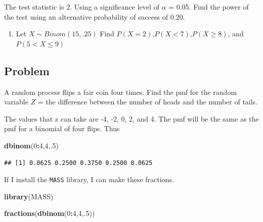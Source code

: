 \documentclass[]{book}
\newenvironment{Shaded}{\begin{snugshade}}{\end{snugshade}}
\newcommand{\KeywordTok}[1]{\textcolor[rgb]{0.13,0.29,0.53}{\textbf{#1}}}
\newcommand{\DecValTok}[1]{\textcolor[rgb]{0.00,0.00,0.81}{#1}}
\newcommand{\OperatorTok}[1]{\textcolor[rgb]{0.81,0.36,0.00}{\textbf{#1}}}
\newcommand{\NormalTok}[1]{#1}
\providecommand{\tightlist}{%
  \setlength{\itemsep}{0pt}\setlength{\parskip}{0pt}}
\theoremstyle{definition}
\theoremstyle{definition}
\theoremstyle{definition}
\theoremstyle{remark}
\begin{document}
The test statistic is 2. Using a significance level of \(\alpha\) =
0.05. Find the power of the test using an alternative probability of
success of 0.20.

\begin{enumerate}
\def\labelenumi{\arabic{enumi}.}
\setcounter{enumi}{1}
\tightlist
\item
  Let \(X\sim Binom(15,.25)\) Find \(P(X=2)\),\(P(X<7)\),\(P(X\geq8)\),
  and \(P(5<X\leq9)\)
\end{enumerate}

\subsection{Problem}\label{problem}

A random process flips a fair coin four times. Find the pmf for the
random variable \(Z\) = the difference between the number of heads and
the number of tails.

The values that z can take are -4, -2, 0, 2, and 4. The pmf will be the
same as the pmf for a binomial of four flips. Thus

\begin{Shaded}
\begin{Highlighting}[]
\KeywordTok{dbinom}\NormalTok{(}\DecValTok{0}\OperatorTok{:}\DecValTok{4}\NormalTok{,}\DecValTok{4}\NormalTok{,.}\DecValTok{5}\NormalTok{)}
\end{Highlighting}
\end{Shaded}

\begin{verbatim}
## [1] 0.0625 0.2500 0.3750 0.2500 0.0625
\end{verbatim}

If I install the \texttt{MASS} library, I can make these fractions.

\begin{Shaded}
\begin{Highlighting}[]
\KeywordTok{library}\NormalTok{(MASS)}
\end{Highlighting}
\end{Shaded}

\begin{Shaded}
\begin{Highlighting}[]
\KeywordTok{fractions}\NormalTok{(}\KeywordTok{dbinom}\NormalTok{(}\DecValTok{0}\OperatorTok{:}\DecValTok{4}\NormalTok{,}\DecValTok{4}\NormalTok{,.}\DecValTok{5}\NormalTok{))}
\end{Highlighting}
\end{Shaded}
\end{document}
